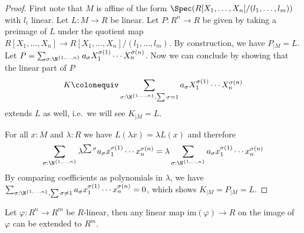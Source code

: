 \begin{proof}
  First note that $M$ is affine of the form $\Spec(R[X_1,\dots,X_n]/(l_1,\dots,l_m))$ with $l_i$ linear.
  Let $L:M\to R$ be linear. Let $P:R^n\to R$ be given by taking a preimage of $L$ under the quotient map $R[X_1,\dots,X_n]\to R[X_1,\dots,X_n]/(l_1,\dots,l_m)$.
  By construction, we have $P_{\vert M}=L$.
  Let $P=\sum_{\sigma:\N^{\{1,\dots,n\}}}a_\sigma X_1^{\sigma(1)}\cdots X_n^{\sigma(n)}$.
  Now we can conclude by showing that the linear part of $P$
  \[
    K\colonequiv \sum_{\sigma:\N^{\{1,\dots,n\}}, \sum \sigma =1}a_\sigma X_1^{\sigma(1)}\cdots X_n^{\sigma(n)}
  \]
  extends $L$ as well, i.e.\ we will see $K_{\vert M}=L$.
  
  For all $x:M$ and $\lambda : R$ we have $L(\lambda x)=\lambda L(x)$ and therefore
  \[
    \sum_{\sigma:\N^{\{1,\dots,n\}}}\lambda^{\sum\sigma} a_\sigma x_1^{\sigma(1)}\cdots x_n^{\sigma(n)}=\lambda \sum_{\sigma:\N^{\{1,\dots,n\}}} a_\sigma x_1^{\sigma(1)}\cdots x_n^{\sigma(n)}
  \]
  By comparing coefficients as polynomials in $\lambda$, we have $\sum_{\sigma:\N^{\{1,\dots,n\}}, \sum \sigma \neq 1}a_\sigma x_1^{\sigma(1)}\cdots x_n^{\sigma(n)}=0$,
  which shows $K_{\vert M}=P_{\vert M}=L$.
\end{proof}

\begin{lemma}
  \label{extend-from-image}
  Let $\varphi:R^n\to R^m$ be $R$-linear, then any linear map $\mathrm{im}(\varphi)\to R$ on the image of $\varphi$ can be extended to $R^m$.
\end{lemma}

